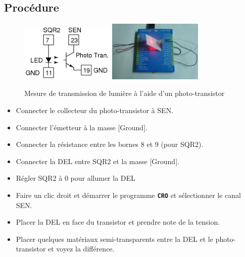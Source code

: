 \documentclass{book}
\newcommand{\nop}{}
\begin{document}
\subsection{Procédure}


\begin{figure}[h!]
\begin{center}
\caption{\label{fig:Light-transmission-measurement}Mesure de transmission de lumière à l'aide d'un photo-transistor }\vspace{0.5em}
\includegraphics[width=0.4\textwidth, height=0.3\textwidth, keepaspectratio]{Schematic-light-bar.png}
\includegraphics[width=0.4\textwidth, height=0.3\textwidth, keepaspectratio]{Pic-light-thru-paper-photo.png}
\end{center}
\end{figure}



\begin{itemize}
  \item Connecter le collecteur du photo-transistor à SEN.
  \item Connecter l'émetteur à la masse [Ground].
  \item Connecter la résistance entre les bornes 8 et 9 (pour SQR2).
  \item Connecter la DEL entre SQR2 et la masse [Ground].
  \item Régler SQR2 à 0 pour allumer la DEL
  \item Faire un clic droit et démarrer le programme  \texttt{\textbf{CRO}\nop} et sélectionner le canal SEN.
  \item Placer la DEL en face du transistor et prendre note de la tension.
  \item Placer quelques matériaux semi-transparents entre la DEL et le photo-transistor et voyez la différence.
\end{itemize}
\end{document}
